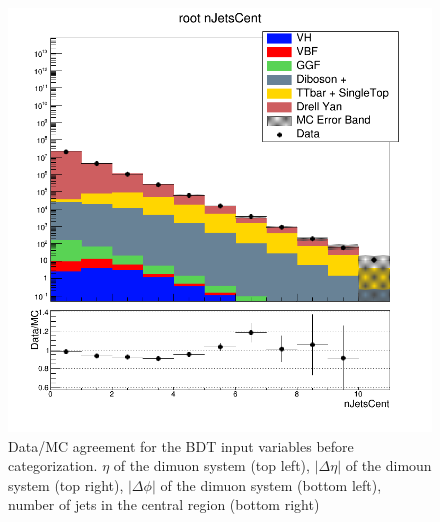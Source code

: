 \begin{figure}[htbp]
  \includegraphics[width=0.49\linewidth]{figures/bdt_cats/nJetsCent_root.png}
  \caption{Data/MC agreement for the BDT input variables before categorization. $\eta$ of the dimuon system (top left), $|\Delta \eta|$ of the dimoun system (top right), $|\Delta \phi|$ of the dimuon system (bottom left), number of jets in the central region (bottom right)}
  \label{fig:higgs_categorization_bdtinput1_inclusive}
\end{figure}


